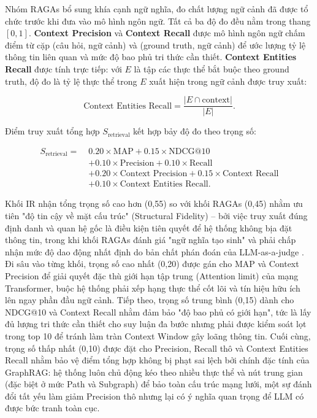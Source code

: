 Nhóm RAGAs bổ sung khía cạnh ngữ nghĩa, đo chất lượng ngữ cảnh đã được tổ chức trước khi đưa vào mô hình ngôn ngữ. Tất cả ba độ đo đều nằm trong thang $[0, 1]$. \textbf{Context Precision} và \textbf{Context Recall} được mô hình ngôn ngữ chấm điểm từ cặp (câu hỏi, ngữ cảnh) và (ground truth, ngữ cảnh) để ước lượng tỷ lệ thông tin liên quan và mức độ bao phủ tri thức cần thiết. \textbf{Context Entities Recall} được tính trực tiếp: với $E$ là tập các thực thể bắt buộc theo ground truth, độ đo là tỷ lệ thực thể trong $E$ xuất hiện trong ngữ cảnh được truy xuất:

\begin{equation}
\text{Context Entities Recall} = \frac{|E \cap \text{context}|}{|E|}.
\end{equation}

Điểm truy xuất tổng hợp $S_{\text{retrieval}}$ kết hợp bảy độ đo theo trọng số:

\begin{equation}
\begin{aligned}
S_{\text{retrieval}} =\;& 0.20 \times \text{MAP}
  + 0.15 \times \text{NDCG@10} \\
& + 0.10 \times \text{Precision}
  + 0.10 \times \text{Recall} \\
& + 0.20 \times \text{Context Precision}
  + 0.15 \times \text{Context Recall} \\
& + 0.10 \times \text{Context Entities Recall}.
\end{aligned}
\end{equation}

Khối IR nhận tổng trọng số cao hơn (0,55) so với khối RAGAs (0,45) nhằm ưu tiên "độ tin cậy về mặt cấu trúc" (Structural Fidelity) – bởi việc truy xuất đúng định danh và quan hệ gốc là điều kiện tiên quyết để hệ thống không bịa đặt thông tin, trong khi khối RAGAs đánh giá "ngữ nghĩa tạo sinh" và phải chấp nhận mức độ dao động nhất định do bản chất phán đoán của LLM-as-a-judge
. Đi sâu vào từng khối, trọng số cao nhất (0,20) được gán cho MAP và Context Precision để giải quyết đặc thù giới hạn tập trung (Attention limit) của mạng Transformer, buộc hệ thống phải xếp hạng thực thể cốt lõi và tín hiệu hữu ích lên ngay phần đầu ngữ cảnh. Tiếp theo, trọng số trung bình (0,15) dành cho NDCG@10 và Context Recall nhằm đảm bảo "độ bao phủ có giới hạn", tức là lấy đủ lượng tri thức cần thiết cho suy luận đa bước nhưng phải được kiểm soát lọt trong top 10 để tránh làm tràn Context Window gây loãng thông tin. Cuối cùng, trọng số thấp nhất (0,10) được đặt cho Precision, Recall thô và Context Entities Recall nhằm bảo vệ điểm tổng hợp không bị phạt sai lệch bởi chính đặc tính của GraphRAG: hệ thống luôn chủ động kéo theo nhiều thực thể và nút trung gian (đặc biệt ở mức Path và Subgraph) để bảo toàn cấu trúc mạng lưới, một sự đánh đổi tất yếu làm giảm Precision thô nhưng lại có ý nghĩa quan trọng để LLM có được bức tranh toàn cục.

